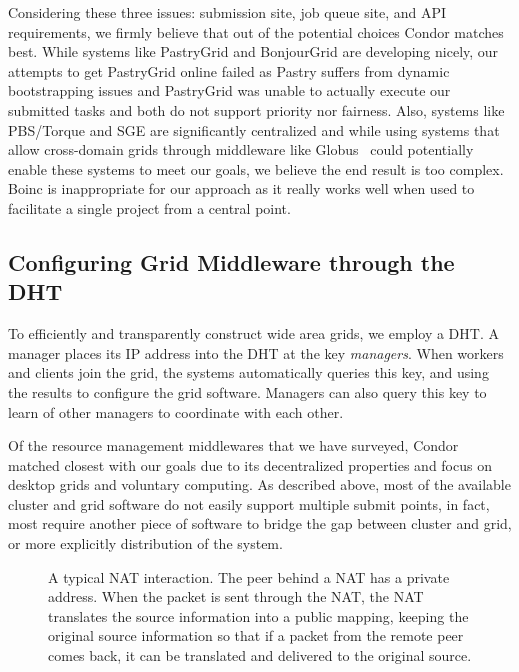 \documentclass[conference]{IEEEtran}
\begin{document}
Considering these three issues:  submission site, job queue site, and API
requirements, we firmly believe that out of the potential choices Condor
matches best.  While systems like PastryGrid and BonjourGrid are developing
nicely, our attempts to get PastryGrid online failed as Pastry suffers from
dynamic bootstrapping issues and PastryGrid was unable to actually execute our
submitted tasks and both do not support priority nor fairness.  Also, systems
like PBS/Torque and SGE are significantly centralized and while using systems
that allow cross-domain grids through middleware like Globus~\cite{globus}
could potentially enable these systems to meet our goals, we believe the end
result is too complex.  Boinc is inappropriate for our approach as it really
works well when used to facilitate a single project from a central point.

\subsection{Configuring Grid Middleware through the DHT}
\label{condor}

To efficiently and transparently construct wide area grids, we employ a DHT.  A
manager places its IP address into the DHT at the key \emph{managers}.  When
workers and clients join the grid, the systems automatically queries this key,
and using the results to configure the grid software.  Managers can also query
this key to learn of other managers to coordinate with each other.

Of the resource management middlewares that we have surveyed, Condor matched
closest with our goals due to its decentralized properties and focus on desktop
grids and voluntary computing.  As described above, most of the available
cluster and grid software do not easily support multiple submit points, in
fact, most require another piece of software to bridge the gap between cluster
and grid, or more explicitly distribution of the system.

\begin{figure}[h!t!]
\centering
{}
\caption{A typical NAT interaction. The peer behind a NAT has a private address.
When the packet is sent through the NAT, the NAT translates the source information
into a public mapping, keeping the original source information so that if a
packet from the remote peer comes back, it can be translated and delivered to
the original source.}
\label{fig:nat}
\end{figure}
\end{document}
